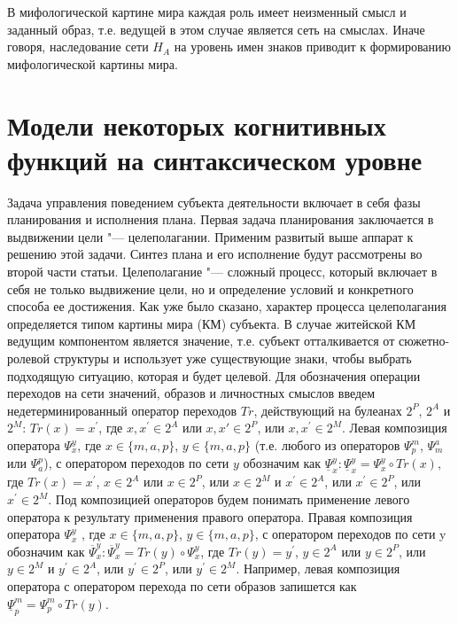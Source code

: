 В мифологической картине мира каждая роль имеет неизменный смысл и заданный образ, т.е. ведущей в этом случае является сеть на смыслах. Иначе говоря, наследование сети $H_A$ на уровень имен знаков приводит к формированию мифологической картины мира.

\chapter{Модели некоторых когнитивных функций на синтаксическом уровне} \label{AppendixB}

Задача управления поведением субъекта деятельности включает в себя фазы планирования и исполнения плана. Первая задача планирования заключается в выдвижении цели "--- целеполагании. Применим развитый выше аппарат к решению этой задачи. Синтез плана и его исполнение будут рассмотрены во второй части статьи.
Целеполагание "--- сложный процесс, который включает в себя не только выдвижение цели, но и определение условий и конкретного способа ее достижения. Как уже было сказано, характер процесса целеполагания определяется типом картины мира (КМ) субъекта. В случае житейской КМ ведущим компонентом является значение, т.е. субъект отталкивается от сюжетно-ролевой структуры и использует уже существующие знаки, чтобы выбрать подходящую ситуацию, которая и будет целевой.
Для обозначения операции переходов на сети значений, образов и личностных смыслов введем недетерминированный оператор переходов $Tr$, действующий на булеанах $2^P$, $2^A$ и $2^M$: $Tr(x)=x^\prime$, где $x,x^\prime\in 2^A$ или $x,x\prime\in 2^P$, или $x,x^\prime\in 2^M$. Левая композиция оператора $\Psi_x^y$, где $x\in\{m, a, p\}$, $y\in\{m, a, p\}$ (т.е. любого из операторов  $\Psi_p^m$, $\Psi_m^a$ или $\Psi_a^p$), с оператором переходов по сети $y$ обозначим как $\underline{\Psi}_x^y:\underline{\Psi}_x^y=\Psi_x^y\circ Tr(x)$, где $Tr(x)=x^\prime$, $x\in 2^A$ или $x\in 2^P$, или $x\in 2^M$ и $x^\prime\in 2^A$, или $x^\prime\in 2^P$, или $x^\prime\in 2^M$. Под композицией операторов будем понимать применение левого оператора к результату применения правого оператора. Правая композиция оператора $\Psi_x^y$ , где $x\in\{m, a, p\}$, $y\in\{m, a, p\}$, с оператором переходов по сети y обозначим как $\overline{\Psi}_x^y: \overline{\Psi}_x^y=Tr(y)\circ\Psi_x^y$, где $Tr(y)=y^\prime$, $y\in 2^A$ или $y\in 2^P$, или $y\in 2^M$ и  $y^\prime\in 2^A$, или $y^\prime\in 2^P$, или $y^\prime\in 2^M$. Например, левая композиция оператора   с оператором перехода по сети образов запишется как $\underline{\Psi}_p^m=\Psi_p^m\circ Tr(y)$.

